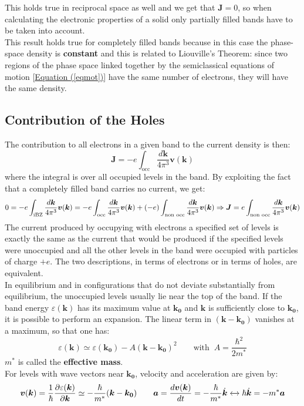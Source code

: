 \documentclass[10.75pt,a4paper,openright,bottom=2cm]{article}
\renewcommand{\Vec}[1]{\boldsymbol{#1}}
\renewcommand{\refeq}[1]{\hyperref[#1]{Equation (\ref{#1})}}
\newcommand{\RN}[1]{%
  \textup{\uppercase\expandafter{\romannumeral#1}}%
}
\begin{document}
This holds true in reciprocal space as well and we get that $\Vec{J}=0$, so when calculating the electronic properties of a solid only partially filled bands have to be taken into account.\\  
This result holds true for completely filled bands because in this case the phase-space density is \textbf{constant} and this is related to Liouville's Theorem: since two regions of the phase space linked together by the semiclassical equations of motion [\refeq{eqmot}] have the same number of electrons, they will have the same density.
\subsection{Contribution of the Holes}
The contribution to all electrons in a given band to the current density is then:
\[
\Vec{J}=-e\int_{\text{occ}}\frac{d\Vec{k}}{4\pi^3}\Vec{v}(\Vec{k})
\]
where the integral is over all occupied levels in the band. By exploiting the fact that a completely filled band carries no current, we get:
\[
0=-e\int_{\text{\RN{1}BZ}}\frac{d\Vec{k}}{4\pi^3}\Vec{v}(\Vec{k})=-e\int_{\text{occ}}\frac{d\Vec{k}}{4\pi^3}\Vec{v}(\Vec{k})+(-e)\int_{\text{non occ}}\frac{d\Vec{k}}{4\pi^3}\Vec{v}(\Vec{k})\Rightarrow\Vec{J}=e\int_{\text{non occ}}\frac{d\Vec{k}}{4\pi^3}\Vec{v}(\Vec{k})
\]
The current produced by occupying with electrons a specified set of levels is exactly the same as the current that would be produced if the specified levels were unoccupied and all the other levels in the band were occupied with particles of charge $+e$. The two descriptions, in terms of electrons or in terms of holes, are equivalent.\\
In equilibrium and in configurations that do not deviate substantially from equilibrium, the unoccupied levels usually lie near the top of the band. If the band energy $\varepsilon(\Vec{k})$ has its maximum value at $\Vec{k_0}$ and $\Vec{k}$ is sufficiently close to $\Vec{k_0}$, it is possible to perform an expansion. The linear term in $(\Vec{k}-\Vec{k_0})$ vanishes at a maximum, so that one has:
\[
\varepsilon(\Vec{k})\simeq \varepsilon(\Vec{k_0})-A(\Vec{k}-\Vec{k_0})^2 \qquad\text{with}\;\; A=\frac{\hbar^2}{2m^*}
\]
$m^*$ is called the \textbf{effective mass}.\\
For levels with wave vectors near $\Vec{k_0}$, velocity and acceleration are given by:
\[
\Vec{v}(\Vec{k})=\frac{1}{\hbar}\frac{\partial \varepsilon(\Vec{k})}{\partial\Vec{k}}\simeq-\frac{\hbar}{m^*}(\Vec{k}-\Vec{k_0}) \qquad \Vec{a}=\frac{d\Vec{v}(\Vec{k})}{dt}=-\frac{\hbar}{m^*}\Dot{\Vec{k}}\xleftrightarrow[]{}\hbar\Dot{\Vec{k}}=-m^*\Vec{a}
\]
\end{document}
